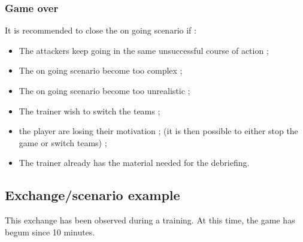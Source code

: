 \documentclass[11pt]{article} %
\begin{document}
\subsubsection{Game over}
It is recommended to close the on going scenario if : 
\begin{itemize}
\item The attackers keep going in the same unsuccessful course of action ; 
\item The on going scenario become too complex ;
\item The on going scenario become too unrealistic ;
\item The trainer wish to switch the teams ;
\item the player are losing their motivation ;
(it is then possible to either stop the game or switch teams) ;
\item The trainer already has the material needed for the debriefing.
\end{itemize}

\subsection{Exchange/scenario example}


This exchange has been observed during a training. At this time, the game has begum since 
10 minutes.
\end{document}
